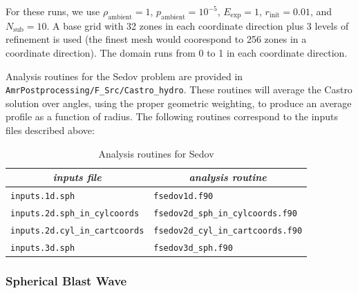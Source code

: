 For these runs, we use $\rho_\mathrm{ambient} = 1$,
$p_\mathrm{ambient} = 10^{-5}$, $E_\mathrm{exp} = 1$, $r_\mathrm{init}
 = 0.01$, and $N_\mathrm{sub} = 10$.  A base grid with 32 zones in each
coordinate direction plus 3 levels of refinement is used (the finest
mesh would coorespond to 256 zones in a coordinate direction).  The
domain runs from 0 to 1 in each coordinate direction.




Analysis routines for the Sedov problem are provided in
{\tt AmrPostprocessing/F\_Src/Castro\_hydro}.  These routines will
average the Castro solution over angles, using the proper geometric
weighting, to produce an average profile as a function of radius.
The following routines correspond to the inputs files described above:
\begin{table}[h]
\centering
{\small
\begin{tabular}{|l|l|} \hline
\multicolumn{1}{|c}{\em inputs file} &  \multicolumn{1}{|c|}{\em analysis routine} \\
\hline
{\tt inputs.1d.sph} & {\tt fsedov1d.f90} \\
%
{\tt inputs.2d.sph\_in\_cylcoords} & {\tt fsedov2d\_sph\_in\_cylcoords.f90} \\
%
{\tt inputs.2d.cyl\_in\_cartcoords} & {\tt fsedov2d\_cyl\_in\_cartcoords.f90} \\
%
{\tt inputs.3d.sph} & {\tt fsedov3d\_sph.f90} \\
\hline
\end{tabular}
} %
\caption{\label{table:fsedov} Analysis routines for Sedov}
\end{table}

\subsubsection{Spherical Blast Wave}


